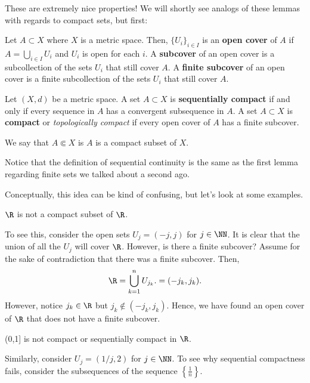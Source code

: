 These are extremely nice properties! We will shortly see analogs of these lemmas with regards to compact sets, but first:
\begin{definition}[Covers]
Let $A\subset X$ where $X$ is a metric space. Then, $\{U_i\}_{i\in I}$ is an \textbf{open cover} of $A$ if $A = \bigcup_{i\in I} U_i$ and $U_i$ is open for each $i$. A \textbf{subcover} of an open cover is a subcollection of the sets $U_i$ that still cover $A$. A \textbf{finite subcover} of an open cover is a finite subcollection of the sets $U_i$ that still cover $A$.
\end{definition}

\begin{definition}[Compactness]
Let $(X,d)$ be a metric space. A set $A\subset X$ is \textbf{sequentially compact} if and only if every sequence in $A$ has a convergent subsequence in $A$. A set $A\subset X$ is \textbf{compact} or \textit{topologically compact} if every open cover of $A$ has a finite subcover.
\end{definition}

\begin{notation}
We say that $A\Subset X$ is $A$ is a compact subset of $X$.
\end{notation}

\begin{remark}
Notice that the definition of sequential continuity is the same as the first lemma regarding finite sets we talked about a second ago.
\end{remark}

Conceptually, this idea can be kind of confusing, but let's look at some examples.
\begin{example}
$\R$ is not a compact subset of $\R$.
\end{example}
To see this, consider the open sets $U_j = (-j,j)$ for $j\in \NN$. It is clear that the union of all the $U_j$ will cover $\R$. However, is there a finite subcover? Assume for the sake of contradiction that there was a finite subcover. Then, 
    \[
    \R = \bigcup_{k=1}^n {U}_{j_k}. = (-j_k, j_k).
    \]
However, notice $j_k\in \R$ but $j_k \notin (-j_k, j_k)$. Hence, we have found an open cover of $\R$ that does not have a finite subcover.

\begin{example}
(0,1] is not compact or sequentially compact in $\R$.
\end{example}
Similarly, consider $U_j = (1/j, 2)$ for $j\in \NN$. To see why sequential compactness fails, consider the subsequences of the sequence $\left\{\frac{1}{n}\right\}$.

